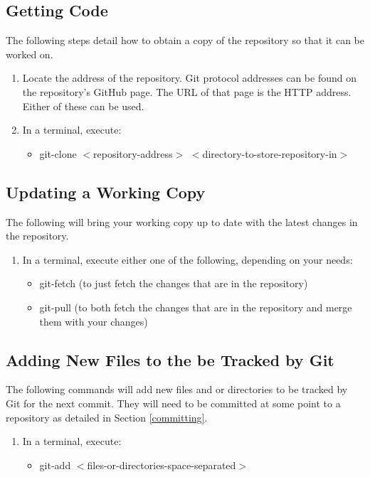 \documentclass{article}
\begin{document}
\subsection{Getting Code}
\label{get-code}
The following steps detail how to obtain a copy of the repository so that it can be worked on.
\begin{enumerate}
	\item Locate the address of the repository. Git protocol addresses can be found on the repository's GitHub page. The URL of that page is the HTTP address. Either of these can be used.
	\item In a terminal, execute:
	\begin{itemize}
		\item git-clone \(<\)repository-address\(>\) \(<\)directory-to-store-repository-in\(>\)
	\end{itemize}
\end{enumerate}

\subsection{Updating a Working Copy}
\label{update}
The following will bring your working copy up to date with the latest changes in the repository.
\begin{enumerate}
	\item In a terminal, execute either one of the following, depending on your needs:
	\begin{itemize}
		\item git-fetch (to just fetch the changes that are in the repository)
		\item git-pull (to both fetch the changes that are in the repository and merge them with your changes)
	\end{itemize}
\end{enumerate}

\subsection{Adding New Files to the be Tracked by Git}
\label{add-files}
The following commands will add new files and or directories to be tracked by Git for the next commit. They will need to be committed at some point to a repository as detailed in Section \ref{committing}.
\begin{enumerate}
	\item In a terminal, execute:
	\begin{itemize}
		\item git-add \(<\)files-or-directories-space-separated\(>\)
	\end{itemize}
\end{enumerate}
\end{document}
